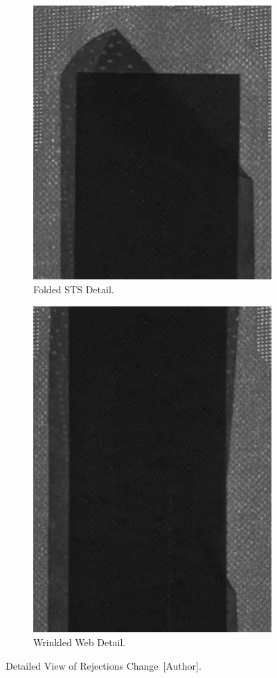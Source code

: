 \begin{figure}[H]
\centering
  \begin{subfigure}{0.45\textwidth}
  \centering
    \includegraphics[width=0.8\linewidth]{FIGURES/DetailA_L15.png}
    \caption{Folded STS Detail.}
  \end{subfigure}
  \begin{subfigure}{0.45\textwidth}
  \centering
    \includegraphics[width=0.8\linewidth]{FIGURES/DetailB_L15.png}
    \caption{Wrinkled Web Detail.}
  \end{subfigure}
  \caption{Detailed View of Rejections Change~[Author].}
    \label{manifolds}
\end{figure}

